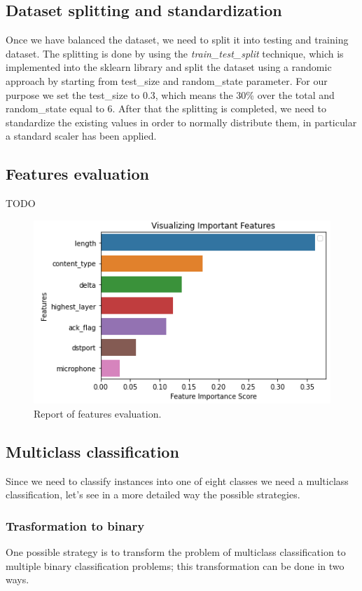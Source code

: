 \documentclass[sigconf]{acmart}
\begin{document}
    \subsection{Dataset splitting and standardization}
    Once we have balanced the dataset, we need to split it into testing and training dataset. The splitting is done by using the \textit{train\_test\_split} technique, which is implemented into the sklearn library and split the dataset using a randomic approach by starting from test\_size and random\_state parameter. For our purpose we set the test\_size to 0.3, which means the 30\% over the total and random\_state equal to 6. After that the splitting is completed, we need to standardize the existing values in order to normally distribute them, in particular a standard scaler has been applied.

    \subsection{Features evaluation}
    TODO
    \begin{figure}[h!]
        \includegraphics[width=\linewidth]{img/important_features.png}
        \caption{Report of features evaluation.}
        \label{fig:important_features}
    \end{figure}

    \subsection{Multiclass classification}
    Since we need to classify instances into one of eight classes we need a multiclass classification, let's see in a more detailed way the possible strategies.

    \subsubsection{Trasformation to binary}
    One possible strategy is to transform the problem of multiclass classification to multiple binary classification problems; this transformation can be done in two ways.
\end{document}
